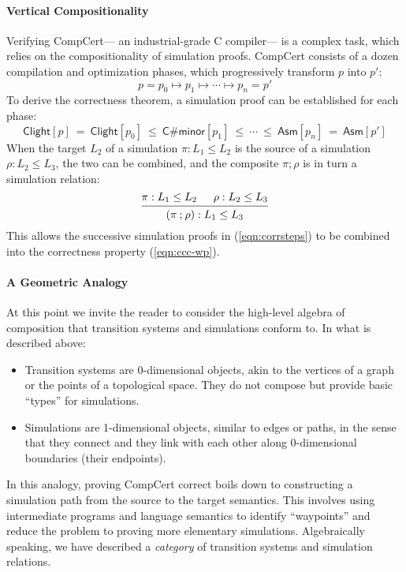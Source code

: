 \documentclass[acmsmall,screen,review,anonymous]{acmart}
\newcommand{\kw}[1]{\ensuremath{ \mathsf{#1} }}
\begin{document}
\paragraph{Vertical Compositionality}

Verifying CompCert---%
an industrial-grade C compiler---%
is a complex task,
which relies on the compositionality of simulation proofs.
CompCert consists of a dozen compilation and optimization phases,
which progressively transform $p$ into $p'$:
\[
  p = p_0 \longmapsto p_1 \longmapsto \cdots \longmapsto p_n = p'
\]
To derive the correctness theorem,
a simulation proof can be established for each phase:
\begin{equation}
  \kw{Clight}[p] \:=\:
  \kw{Clight}[p_0] \:\le\: \kw{C\#minor}[p_1] \:\le\: \cdots \:\le\: \kw{Asm}[p_n]
  \:=\: \kw{Asm}[p']
  \label{eqn:corrsteps}
\end{equation}
When the target $L_2$ of a simulation $\pi : L_1 \le L_2$
is the source of a simulation $\rho : L_2 \le L_3$,
the two can be combined, and the composite $\pi \mathbin; \rho$
is in turn a simulation relation:
\[
  \begin{prooftree}
    \hypo{\pi : L_1 \le L_2}
    \hypo{\rho : L_2 \le L_3}
    \infer2{(\pi \mathbin; \rho) : L_1 \le L_3}
  \end{prooftree}
\]
This allows
the successive simulation proofs in (\ref{eqn:corrsteps})
to be combined into the correctness property (\ref{eqn:ccc-wp}).

\paragraph{A Geometric Analogy}

At this point we invite the reader
to consider the high-level
algebra of composition that
transition systems and simulations conform to.
In what is described above:
\begin{itemize}
  \item Transition systems are 0-dimensional objects,
    akin to the vertices of a graph or
    the points of a topological space.
    They do not compose
    but provide basic ``types'' for simulations.
  \item Simulations are 1-dimensional objects,
    similar to edges or paths,
    in the sense that they connect
    and they link with each other along 0-dimensional boundaries
    (their endpoints).
\end{itemize}
In this analogy,
proving CompCert correct
boils down to constructing a simulation path
from the source to the target semantics.
This involves using intermediate programs and language semantics
to identify ``waypoints'' and reduce the problem
to proving more elementary simulations.
Algebraically speaking,
we have described a
\emph{category} of transition systems and simulation relations.
\end{document}
